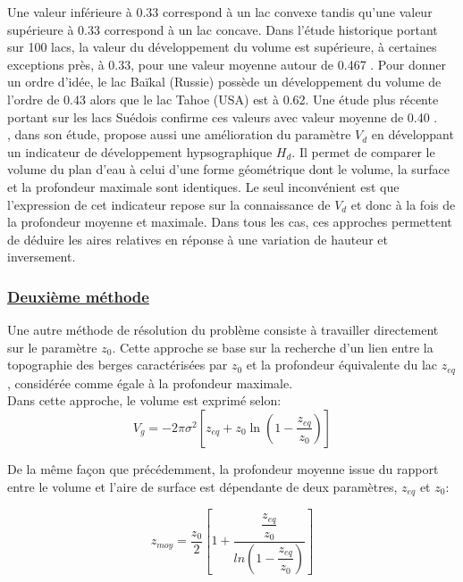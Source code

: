 \noindent Une valeur inférieure à 0.33 correspond à un lac convexe tandis qu'une valeur supérieure à 0.33 correspond à un lac concave. Dans l'étude historique portant sur 100 lacs, la valeur du développement du volume est supérieure, à certaines exceptions près, à 0.33, pour une valeur moyenne autour de 0.467 \citep{neumann1959}. Pour donner un ordre d'idée, le lac Baïkal (Russie) possède un développement du volume de l'ordre de 0.43 alors que le lac Tahoe (USA) est à 0.62. Une étude plus récente portant sur les lacs Suédois confirme ces valeurs avec valeur moyenne de 0.40 \citep{johansson2007}.\\
\citet{johansson2007}, dans son étude, propose aussi une amélioration du paramètre $V_{d}$ en développant un indicateur de développement hypsographique $H_{d}$. Il permet de comparer le volume du plan d'eau à celui d'une forme géométrique dont le volume, la surface et la profondeur maximale sont identiques. Le seul inconvénient est que l'expression de cet indicateur repose sur la connaissance de $V_{d}$ et donc à la fois de la profondeur moyenne et maximale. Dans tous les cas, ces approches permettent de déduire les aires relatives en réponse à une variation de hauteur et inversement.
\clearpage
\subsubsection*{\underline{{\selectfont Deuxième méthode}}}

Une autre méthode de résolution du problème consiste à travailler directement sur le paramètre $z_{0}$. Cette approche se base sur la recherche d'un lien entre la topographie des berges caractérisées par $z_{0}$ et la profondeur équivalente du lac $z_{eq}$, considérée comme égale à la profondeur maximale.\\

\noindent Dans cette approche, le volume est exprimé selon:
\begin{equation}
\label{eq:vol_gaussian_z}
V_{g} = -2\pi\sigma^2\left[z_{eq} + z_0 \ln\left(1-\frac{z_{eq}}{z_0}\right)\right]
\end{equation}

\noindent De la même façon que précédemment, la profondeur moyenne issue du rapport entre le volume et l'aire de surface est dépendante de deux paramètres, $z_{eq}$ et $z_0$:

\begin{equation}
z_{moy} = \frac{z_0}{2}\left[1+\dfrac{\dfrac{z_{eq}}{z_0}}{ln(1-\dfrac{z_{eq}}{z_0})}\right]
\end{equation}

